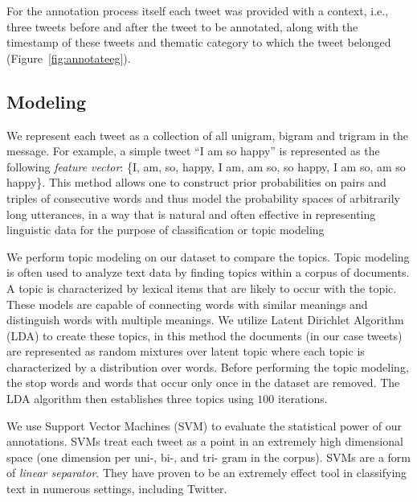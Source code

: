 \documentclass[11pt]{article}
\begin{document}
For the annotation process itself each tweet was provided with a context, i.e., three tweets before and after the tweet to be annotated, along with the timestamp of these tweets and thematic category to which the tweet belonged (Figure~\ref{fig:annotateeg}).






\subsection{Modeling}
We represent each tweet as a collection of  all unigram, bigram and trigram in the message. For example, a simple tweet ``I am so happy'' is represented as the following \emph{feature vector}: \{I, am, so, happy, I am, am so, so happy, I am so, am so happy\}. This method allows one to construct prior probabilities on pairs and triples of consecutive words and thus model the probability spaces of arbitrarily long utterances, in a way that is natural and often effective in representing linguistic data for the purpose of classification or topic modeling



We perform topic modeling on our dataset to compare the topics. Topic modeling is often used to analyze text data by finding topics within a corpus of documents. A topic is characterized by lexical items that are likely to occur with the topic. These models are capable of connecting words with similar meanings and distinguish words with multiple meanings. We utilize  Latent Dirichlet Algorithm (LDA) \cite{Blei} to create these topics, in this method the documents (in our case tweets) are represented as random mixtures over latent topic where each topic is characterized by a distribution over words. Before performing the topic modeling, the stop words and words that occur only once in the dataset are removed. The LDA algorithm then establishes three topics using $100$ iterations. 

We use Support Vector Machines (SVM) to evaluate the statistical power of our annotations. SVMs treat each tweet as a point in an extremely high dimensional space (one dimension per uni-, bi-, and tri- gram in the corpus). SVMs are a form of \emph{linear separator}. They have proven to be an extremely effect tool in classifying text in numerous settings, including Twitter. 
\end{document}
